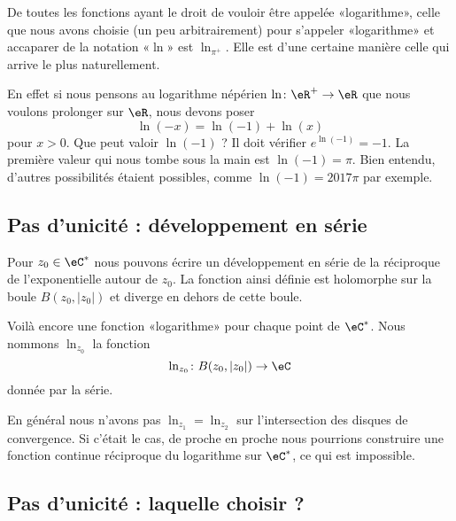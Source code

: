 De toutes les fonctions ayant le droit de vouloir être appelée «logarithme», celle que nous avons choisie (un peu arbitrairement) pour s'appeler «logarithme» et accaparer de la notation «\( \ln\)» est \( \ln_{\pi^+}\). Elle est d'une certaine manière celle qui arrive le plus naturellement.

En effet si nous pensons au logarithme népérien \( \ln\colon \eR^+\to \eR\) que nous voulons prolonger sur \( \eR\), nous devons poser
\begin{equation}
	\ln(-x)=\ln(-1)+\ln(x)
\end{equation}
pour \( x>0\). Que peut valoir \( \ln(-1)\) ? Il doit vérifier \(  e^{\ln(-1)}=-1\). La première valeur qui nous tombe sous la main est \( \ln(-1)=\pi\). Bien entendu, d'autres possibilités étaient possibles, comme \( \ln(-1)=2017\pi\) par exemple.

\subsection{Pas d'unicité : développement en série}

Pour \( z_0\in \eC^*\) nous pouvons écrire un développement en série de la réciproque de l'exponentielle autour de \( z_0\). La fonction ainsi définie est holomorphe sur la boule \( B(z_0,| z_0 |)\) et diverge en dehors de cette boule.

Voilà encore une fonction «logarithme» pour chaque point de \( \eC^*\). Nous nommons \( \ln_{z_0}\) la fonction
\begin{equation}
	\ln_{z_0}\colon B(z_0,| z_0 |)\to \eC
\end{equation}
donnée par la série.

En général nous n'avons pas \( \ln_{z_1}=\ln_{z_2}\) sur l'intersection des disques de convergence. Si c'était le cas, de proche en proche nous pourrions construire une fonction continue réciproque du logarithme sur \( \eC^*\), ce qui est impossible.

\subsection{Pas d'unicité : laquelle choisir ?}

